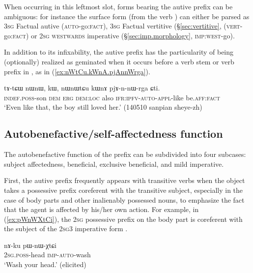 When occurring in this leftmost slot, forms bearing the autive prefix can be ambiguous: for instance the surface form  (from the verb ) can either be parsed as \textsc{3sg} Factual autive  (\textsc{auto}-go:\textsc{fact}), \textsc{3sg} Factual vertitive (§\ref{sec:vertitive}, (\textsc{vert}-go:\textsc{fact}) or \textsc{2sg} \textsc{westwards} imperative (§\ref{sec:imp.morphology}, \textsc{imp}:\textsc{west}-go).

In addition to its infixability, the autive prefix has the particularity of being (optionally) realized as geminated  when it occurs before a verb stem or verb prefix in , as in (\ref{ex:nWtCu.kWnA.pjAnnWrga}).

\begin{exe}
\ex \label{ex:nWtCu.kWnA.pjAnnWrga}
\gll  tɤ-tɕɯ nɯnɯ, kɯ, nɯnɯtɕu kɯnɤ pjɤ-n-nɯ-rga ɕti. \\
\textsc{indef}.\textsc{poss}-son \textsc{dem} \textsc{erg} \textsc{dem}:\textsc{loc} also \textsc{ifr}:\textsc{ipfv}-\textsc{auto}-\textsc{appl}-like be.\textsc{aff}:\textsc{fact} \\
\glt `Even like that, the boy still loved her.' (140510 sanpian sheye-zh) 
\end{exe}

\subsection{Autobenefactive/self-affectedness function}  \label{sec:autoben.proper}
The autobenefactive function of the  prefix can be subdivided into four subcases: subject affectedness, beneficial, exclusive beneficial, and mild imperative.

First, the autive prefix frequently appears with transitive verbs when the object takes a possessive prefix coreferent with the transitive subject, especially in the case of body parts and other inalienably possessed nouns, to emphasize the fact that the agent is affected by his/her own action. For example, in (\ref{ex:pWnWXtCi}), the \textsc{2sg} possessive prefix on the body part  is coreferent with the subject of the 2\textsc{sg}\fl{}3 imperative form .

\begin{exe}
\ex \label{ex:pWnWXtCi}
\gll  nɤ-ku pɯ-nɯ-χtɕi  \\
\textsc{2sg}.\textsc{poss}-head \textsc{imp}-\textsc{auto}-wash \\
\glt `Wash your head.' (elicited)
\end{exe}

